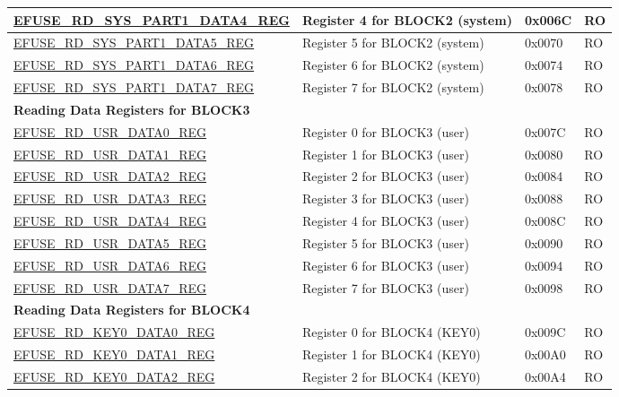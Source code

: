 \begin{longtable}{ | p{7cm} | p{7.2cm} | p{1.3cm} | p{1cm} | }
\hyperref[regdesc:EFUSERDSYSPART1DATANREG]{EFUSE\_RD\_SYS\_PART1\_DATA4\_REG} & Register 4 for BLOCK2 (system) & 0x006C & RO \\ \hline
\hyperref[regdesc:EFUSERDSYSPART1DATANREG]{EFUSE\_RD\_SYS\_PART1\_DATA5\_REG} & Register 5 for BLOCK2 (system) & 0x0070 & RO \\ \hline
\hyperref[regdesc:EFUSERDSYSPART1DATANREG]{EFUSE\_RD\_SYS\_PART1\_DATA6\_REG} & Register 6 for BLOCK2 (system) & 0x0074 & RO \\ \hline
\hyperref[regdesc:EFUSERDSYSPART1DATANREG]{EFUSE\_RD\_SYS\_PART1\_DATA7\_REG} & Register 7 for BLOCK2 (system) & 0x0078 & RO \\ \hline
\multicolumn{4}{|l|}{\textbf{Reading Data Registers for BLOCK3}} \\ \hline
\hyperref[regdesc:EFUSERDUSRDATAMREG]{EFUSE\_RD\_USR\_DATA0\_REG} & Register 0 for BLOCK3 (user) & 0x007C & RO \\ \hline
\hyperref[regdesc:EFUSERDUSRDATAMREG]{EFUSE\_RD\_USR\_DATA1\_REG} & Register 1 for BLOCK3 (user) & 0x0080 & RO \\ \hline
\hyperref[regdesc:EFUSERDUSRDATAMREG]{EFUSE\_RD\_USR\_DATA2\_REG} & Register 2 for BLOCK3 (user) & 0x0084 & RO \\ \hline
\hyperref[regdesc:EFUSERDUSRDATAMREG]{EFUSE\_RD\_USR\_DATA3\_REG} & Register 3 for BLOCK3 (user) & 0x0088 & RO \\ \hline
\hyperref[regdesc:EFUSERDUSRDATAMREG]{EFUSE\_RD\_USR\_DATA4\_REG} & Register 4 for BLOCK3 (user) & 0x008C & RO \\ \hline
\hyperref[regdesc:EFUSERDUSRDATAMREG]{EFUSE\_RD\_USR\_DATA5\_REG} & Register 5 for BLOCK3 (user) & 0x0090 & RO \\ \hline
\hyperref[regdesc:EFUSERDUSRDATAMREG]{EFUSE\_RD\_USR\_DATA6\_REG} & Register 6 for BLOCK3 (user) & 0x0094 & RO \\ \hline
\hyperref[regdesc:EFUSERDUSRDATAMREG]{EFUSE\_RD\_USR\_DATA7\_REG} & Register 7 for BLOCK3 (user) & 0x0098 & RO \\ \hline
\multicolumn{4}{|l|}{\textbf{Reading Data Registers for BLOCK4}} \\ \hline
\hyperref[regdesc:EFUSERDKEY0DATANREG]{EFUSE\_RD\_KEY0\_DATA0\_REG} & Register 0 for BLOCK4 (KEY0) & 0x009C & RO \\ \hline
\hyperref[regdesc:EFUSERDKEY0DATANREG]{EFUSE\_RD\_KEY0\_DATA1\_REG} & Register 1 for BLOCK4 (KEY0) & 0x00A0 & RO \\ \hline
\hyperref[regdesc:EFUSERDKEY0DATANREG]{EFUSE\_RD\_KEY0\_DATA2\_REG} & Register 2 for BLOCK4 (KEY0) & 0x00A4 & RO \\ \hline

\end{longtable}

